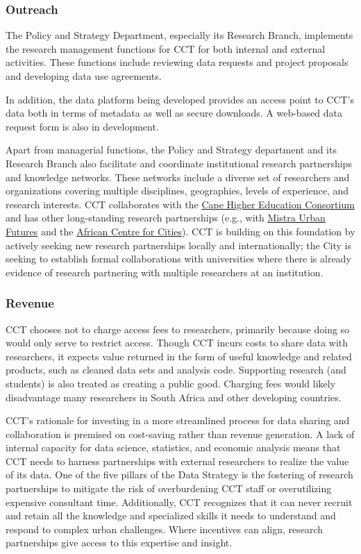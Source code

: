 \documentclass[
]{WileySix}
\begin{document}
\hypertarget{outreach-5}{%
\subsubsection{Outreach}\label{outreach-5}}

The Policy and Strategy Department, especially its Research Branch, implements the research management functions for CCT for both internal and external activities. These functions include reviewing data requests and project proposals and developing data use agreements.

In addition, the data platform being developed provides an access point to CCT's data both in terms of metadata as well as secure downloads. A web-based data request form is also in development.

Apart from managerial functions, the Policy and Strategy department and its Research Branch also facilitate and coordinate institutional research partnerships and knowledge networks. These networks include a diverse set of researchers and organizations covering multiple disciplines, geographies, levels of experience, and research interests. CCT collaborates with the \href{http://www.chec.ac.za}{Cape Higher Education Consortium} and has other long-standing research partnerships (e.g., with \href{https://www.mistraurbanfutures.org}{Mistra Urban Futures} and the \href{https://www.africancentreforcities.net}{African Centre for Cities}). CCT is building on this foundation by actively seeking new research partnerships locally and internationally; the City is seeking to establish formal collaborations with universities where there is already evidence of research partnering with multiple researchers at an institution.

\hypertarget{revenue-5}{%
\subsubsection{Revenue}\label{revenue-5}}

CCT chooses not to charge access fees to researchers, primarily because doing so would only serve to restrict access. Though CCT incurs costs to share data with researchers, it expects value returned in the form of useful knowledge and related products, such as cleaned data sets and analysis code. Supporting research (and students) is also treated as creating a public good. Charging fees would likely disadvantage many researchers in South Africa and other developing countries.

CCT's rationale for investing in a more streamlined process for data sharing and collaboration is premised on cost-saving rather than revenue generation. A lack of internal capacity for data science, statistics, and economic analysis means that CCT needs to harness partnerships with external researchers to realize the value of its data. One of the five pillars of the Data Strategy is the fostering of research partnerships to mitigate the risk of overburdening CCT staff or overutilizing expensive consultant time. Additionally, CCT recognizes that it can never recruit and retain all the knowledge and specialized skills it needs to understand and respond to complex urban challenges. Where incentives can align, research partnerships give access to this expertise and insight.
\end{document}
